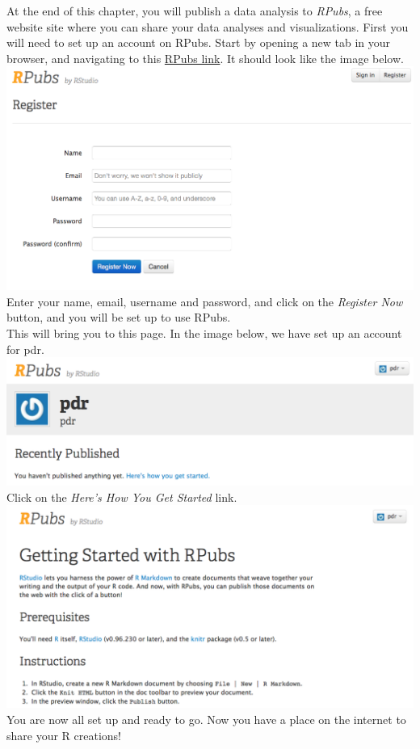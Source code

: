 \documentclass[
]{book}
\begin{document}
At the end of this chapter, you will publish a data analysis to \emph{RPubs}, a free website site where you can share your data analyses and visualizations. First you will need to set up an account on RPubs. Start by opening a new tab in your browser, and navigating to this \href{https://rpubs.com/users/new}{RPubs link}. It should look like the image below.
\includegraphics{images/rpubs1.png}\\
Enter your name, email, username and password, and click on the \emph{Register Now} button, and you will be set up to use RPubs.\\
This will bring you to this page. In the image below, we have set up an account for pdr.\\
\includegraphics{images/rpubs2.png}
Click on the \emph{Here's How You Get Started} link.
\includegraphics{images/rpubs3.png}\\
You are now all set up and ready to go. Now you have a place on the internet to share your R creations!
\end{document}
